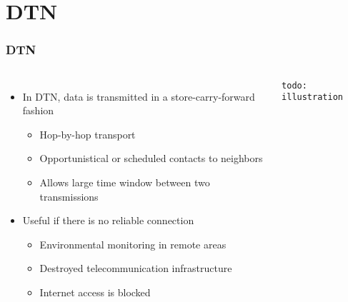 \section{\acf{DTN}}

\begin{frame}
  \frametitle{\acf{DTN}}

  \begin{columns}
  \begin{itemize}
  \item In \acs{DTN}, data is transmitted in a store-carry-forward fashion
    \begin{itemize}
    \item Hop-by-hop transport
    \item Opportunistical or scheduled contacts to neighbors
    \item Allows large time window between two transmissions
    \end{itemize}

  \item Useful if there is no reliable connection
    \begin{itemize}
    \item Environmental monitoring in remote areas
    \item Destroyed telecommunication infrastructure
    \item Internet access is blocked
    \end{itemize}
  \end{itemize}

  \texttt{todo: illustration}
  \end{columns}
\end{frame}
